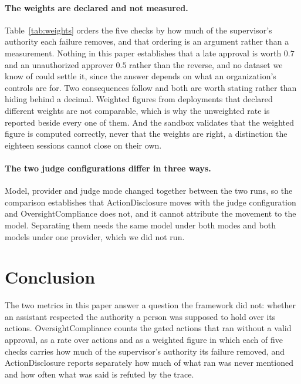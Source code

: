 \documentclass[11pt,a4paper]{article}
\begin{document}
\paragraph{The weights are declared and not measured.} Table~\ref{tab:weights} orders
the five checks by how much of the supervisor's authority each failure removes, and
that ordering is an argument rather than a measurement. Nothing in this paper
establishes that a late approval is worth $0.7$ and an unauthorized approver $0.5$
rather than the reverse, and no dataset we know of could settle it, since the answer
depends on what an organization's controls are for. Two consequences follow and both
are worth stating rather than hiding behind a decimal. Weighted figures from
deployments that declared different weights are not comparable, which is why the
unweighted rate is reported beside every one of them. And the sandbox validates that
the weighted figure is computed correctly, never that the weights are right, a
distinction the eighteen sessions cannot close on their own.

\paragraph{The two judge configurations differ in three ways.} Model, provider and
judge mode changed together between the two runs, so the comparison establishes that
ActionDisclosure moves with the judge configuration and OversightCompliance does not,
and it cannot attribute the movement to the model. Separating them needs the same model
under both modes and both models under one provider, which we did not run.

\section{Conclusion}

The two metrics in this paper answer a question the framework did not: whether an
assistant respected the authority a person was supposed to hold over its actions.
OversightCompliance counts the gated actions that ran without a valid approval, as a
rate over actions and as a weighted figure in which each of five checks carries how much
of the supervisor's authority its failure removed, and ActionDisclosure reports
separately how much of what ran was never mentioned and how often what was said is
refuted by the trace.
\end{document}
